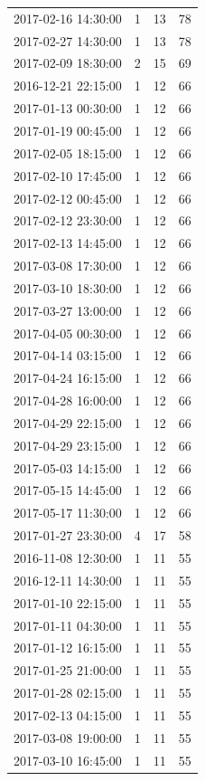 \begin{tabular}{lrrr}
2017-02-16 14:30:00 & 1 & 13 & 78 \\
2017-02-27 14:30:00 & 1 & 13 & 78 \\
2017-02-09 18:30:00 & 2 & 15 & 69 \\
2016-12-21 22:15:00 & 1 & 12 & 66 \\
2017-01-13 00:30:00 & 1 & 12 & 66 \\
2017-01-19 00:45:00 & 1 & 12 & 66 \\
2017-02-05 18:15:00 & 1 & 12 & 66 \\
2017-02-10 17:45:00 & 1 & 12 & 66 \\
2017-02-12 00:45:00 & 1 & 12 & 66 \\
2017-02-12 23:30:00 & 1 & 12 & 66 \\
2017-02-13 14:45:00 & 1 & 12 & 66 \\
2017-03-08 17:30:00 & 1 & 12 & 66 \\
2017-03-10 18:30:00 & 1 & 12 & 66 \\
2017-03-27 13:00:00 & 1 & 12 & 66 \\
2017-04-05 00:30:00 & 1 & 12 & 66 \\
2017-04-14 03:15:00 & 1 & 12 & 66 \\
2017-04-24 16:15:00 & 1 & 12 & 66 \\
2017-04-28 16:00:00 & 1 & 12 & 66 \\
2017-04-29 22:15:00 & 1 & 12 & 66 \\
2017-04-29 23:15:00 & 1 & 12 & 66 \\
2017-05-03 14:15:00 & 1 & 12 & 66 \\
2017-05-15 14:45:00 & 1 & 12 & 66 \\
2017-05-17 11:30:00 & 1 & 12 & 66 \\
2017-01-27 23:30:00 & 4 & 17 & 58 \\
2016-11-08 12:30:00 & 1 & 11 & 55 \\
2016-12-11 14:30:00 & 1 & 11 & 55 \\
2017-01-10 22:15:00 & 1 & 11 & 55 \\
2017-01-11 04:30:00 & 1 & 11 & 55 \\
2017-01-12 16:15:00 & 1 & 11 & 55 \\
2017-01-25 21:00:00 & 1 & 11 & 55 \\
2017-01-28 02:15:00 & 1 & 11 & 55 \\
2017-02-13 04:15:00 & 1 & 11 & 55 \\
2017-03-08 19:00:00 & 1 & 11 & 55 \\
2017-03-10 16:45:00 & 1 & 11 & 55 \\

\end{tabular}
